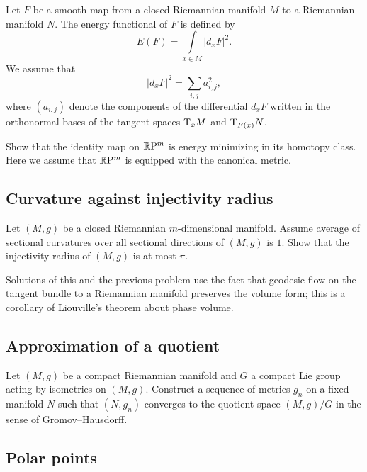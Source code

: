 Let $F$ be a smooth map from a closed Riemannian manifold $M$ to a Riemannian manifold $N$.
The energy functional of $F$ is defined by
\[E(F)=\int\limits_{x\in M} |d_xF|^2.\]
We assume that  
\[|d_xF|^2=\sum_{i,j}a_{i,j}^2,\]
where $(a_{i,j})$ denote the components 
of the differential $d_xF$ 
written in the orthonormal bases of the tangent spaces $\mathrm{T}_xM$ and $\mathrm{T}_{F(x)}N$.

\begin{pr}
Show that the identity map on $\mathbb{R}\mathrm{P}^m$ is 
energy
minimizing in its homotopy class.
Here we assume that $\mathbb{R}\mathrm{P}^m$ is equipped with the canonical metric.
\end{pr}


\subsection*{Curvature against injectivity radius\thm}
\label{scalar-curv}

\begin{pr} 
Let $(M,g)$ be a closed 
Riemannian $m$-dimensional manifold.
Assume average of sectional curvatures over all sectional directions of $(M,g)$ is $1$. 
Show that the injectivity radius of $(M,g)$ is at most $\pi$.
\end{pr}

Solutions of this and the previous problem use the fact that geodesic flow on the tangent bundle to a Riemannian manifold preserves the volume form; this is a corollary of Liouville's theorem about phase volume.

\subsection*{Approximation of a quotient}

\begin{pr}
Let $(M,g)$ be a compact Riemannian manifold 
and $G$ a compact Lie group acting by isometries on $(M,g)$.
Construct a sequence of metrics $g_n$ on a fixed manifold $N$ such that $(N,g_n)$ converges to the quotient space $(M,g)/G$ in the sense of Gromov--Hausdorff.
\end{pr}


\subsection*{Polar points\many}
\label{milka-polar} 

